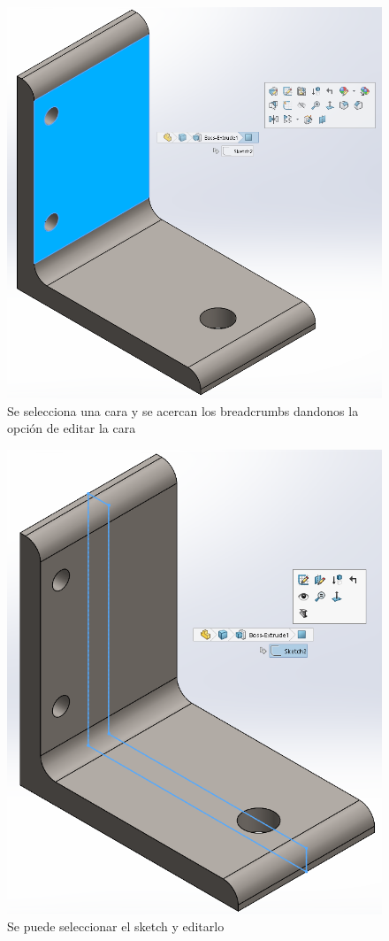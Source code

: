\documentclass{report}
\begin{document}
\begin{figure}[H]
	\centering
	\includegraphics[width=0.75\linewidth, height=0.65\textheight,keepaspectratio]{Imagenes/solidworks_breadcrumbs_01}
	\caption{Se selecciona una cara y se acercan los breadcrumbs dandonos la opción de editar la cara}
	\label{fig:solidworksbreadcrumbs01}
\end{figure}

\begin{figure}[H]
	\centering
	\includegraphics[width=0.75\linewidth, height=0.45\textheight,keepaspectratio]{Imagenes/solidworks_breadcrumbs_02}
	\caption{Se puede seleccionar el sketch y editarlo}
	\label{fig:solidworksbreadcrumbs02}
\end{figure}
\end{document}
